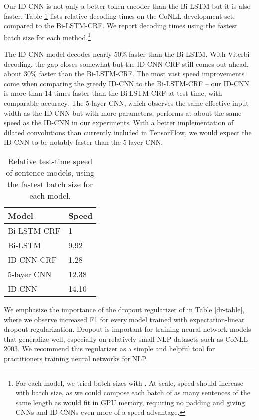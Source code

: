 \documentclass[11pt,letterpaper]{article}
\begin{document}
Our ID-CNN is not only a better token encoder than the Bi-LSTM but it is also faster. Table \ref{sentence-speed-table} lists relative decoding times on the CoNLL development set, compared to the Bi-LSTM-CRF. We report decoding times using the fastest batch size for each method.\footnote{For each model, we tried batch sizes  with . At scale, speed should increase with batch size, as we could compose each batch of as many sentences of the same length as would fit in GPU memory, requiring no padding and giving CNNs and ID-CNNs even more of a speed advantage.}

The ID-CNN model decodes nearly 50\% faster than the Bi-LSTM. With Viterbi decoding, the gap closes somewhat but the ID-CNN-CRF still comes out ahead, about 30\% faster than the Bi-LSTM-CRF. The most vast speed improvements come when comparing the greedy ID-CNN to the Bi-LSTM-CRF -- our ID-CNN is more than 14 times faster than the Bi-LSTM-CRF at test time, with comparable accuracy. The 5-layer CNN, which observes the same effective input width as the ID-CNN but with more parameters, performs at about the same speed as the ID-CNN in our experiments. With a better implementation of dilated convolutions than currently included in TensorFlow, we would expect the ID-CNN to be notably faster than the 5-layer CNN.







\begin{table}
\begin{center}
\begin{tabular}{ll}
    Model & Speed \\ \hline \hline
    Bi-LSTM-CRF & 1 \\ Bi-LSTM & 9.92 \\ ID-CNN-CRF & 1.28 \\ 5-layer CNN & 12.38 \\ ID-CNN & 14.10 \\ \end{tabular}
  \end{center}
  \caption{Relative test-time speed of sentence models, using the fastest batch size for each model.\footnotemark
  \label{sentence-speed-table}}
\end{table}

We emphasize the importance of the dropout regularizer of \citet{ma2017dropout} in Table \ref{dr-table}, where we observe increased F1 for every model trained with expectation-linear dropout regularization. Dropout is important for training neural network models that generalize well, especially on relatively small NLP datasets such as CoNLL-2003. We recommend this regularizer as a simple and helpful tool for practitioners training neural networks for NLP.
\end{document}
